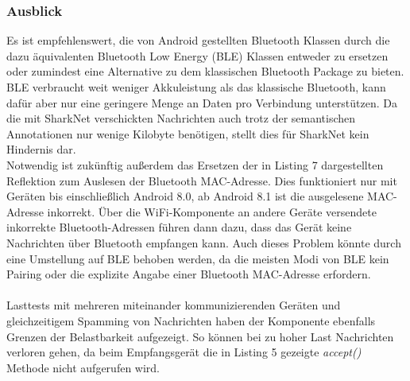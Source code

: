 \subsubsection{Ausblick}
Es ist empfehlenswert, die von Android gestellten Bluetooth Klassen durch die dazu äquivalenten Bluetooth Low Energy (BLE) Klassen entweder zu ersetzen oder zumindest eine Alternative zu dem klassischen Bluetooth Package zu bieten. BLE verbraucht weit weniger Akkuleistung als das klassische Bluetooth, kann dafür aber nur eine geringere Menge an Daten pro Verbindung unterstützen. Da die mit SharkNet verschickten Nachrichten auch trotz der semantischen Annotationen nur wenige Kilobyte benötigen, stellt dies für SharkNet kein Hindernis dar. 
\\Notwendig ist zukünftig außerdem das Ersetzen der in Listing 7 dargestellten Reflektion zum Auslesen der Bluetooth MAC-Adresse. Dies funktioniert nur mit Geräten bis einschließlich Android 8.0, ab Android 8.1 ist die ausgelesene MAC-Adresse inkorrekt. Über die WiFi-Komponente an andere Geräte versendete inkorrekte Bluetooth-Adressen führen dann dazu, dass das Gerät keine Nachrichten über Bluetooth empfangen kann. Auch dieses Problem könnte durch eine Umstellung auf BLE behoben werden, da die meisten Modi von BLE kein Pairing oder die explizite Angabe einer Bluetooth MAC-Adresse erfordern.
\\\\Lasttests mit mehreren miteinander kommunizierenden Geräten und gleichzeitigem Spam\-ming von Nachrichten haben der Komponente ebenfalls Grenzen der Belastbarkeit aufgezeigt. So können bei zu hoher Last Nachrichten verloren gehen, da beim Empfangsgerät die in Listing 5 gezeigte \textit{accept()} Methode nicht aufgerufen wird. 
\newpage

